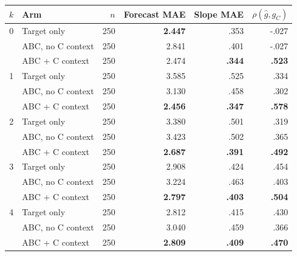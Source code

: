 \begin{center}
\begin{minipage}{\linewidth}
\centering
{}
\label{tab:coin-city-recovery-deepseek}
\small
\begin{tabular}{c l r r r r}
\toprule
$k$ & Arm & $n$ & Forecast MAE & Slope MAE & $\rho(\hat g,g_C)$ \\
\midrule
0 & Target only & 250 & \textbf{2.447} & .353 & -.027 \\
  & ABC, no C context & 250 & 2.841 & .401 & -.027 \\
  & ABC + C context & 250 & 2.474 & \textbf{.344} & \textbf{.523} \\
\midrule
1 & Target only & 250 & 3.585 & .525 & .334 \\
  & ABC, no C context & 250 & 3.130 & .458 & .302 \\
  & ABC + C context & 250 & \textbf{2.456} & \textbf{.347} & \textbf{.578} \\
\midrule
2 & Target only & 250 & 3.380 & .501 & .319 \\
  & ABC, no C context & 250 & 3.423 & .502 & .365 \\
  & ABC + C context & 250 & \textbf{2.687} & \textbf{.391} & \textbf{.492} \\
\midrule
3 & Target only & 250 & 2.908 & .424 & .454 \\
  & ABC, no C context & 250 & 3.224 & .463 & .403 \\
  & ABC + C context & 250 & \textbf{2.797} & \textbf{.403} & \textbf{.504} \\
\midrule
4 & Target only & 250 & 2.812 & .415 & .430 \\
  & ABC, no C context & 250 & 3.040 & .459 & .366 \\
  & ABC + C context & 250 & \textbf{2.809} & \textbf{.409} & \textbf{.470} \\
\bottomrule
\end{tabular}
\end{minipage}
\end{center}

